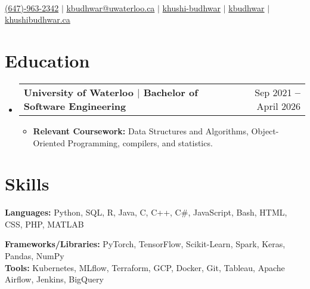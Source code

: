 \documentclass[letterpaper,11pt]{article}
\makeatletter
\newcommand{\resumeItem}[1]{
  \item\small{
    {#1 \vspace{-2pt}}
  }
}
\newcommand{\resumeSubheading}[2]{
  \vspace{-2pt}\item
    \begin{tabular*}{0.97\textwidth}[t]{l@{\extracolsep{\fill}}r}
      \textbf{#1} & \small{#2} \\
    \end{tabular*}\vspace{-5pt}
}
\newcommand{\resumeSubHeadingListStart}{\begin{itemize}[leftmargin=0.15in, label={}]}
\newcommand{\resumeSubHeadingListEnd}{\end{itemize}}
\newcommand{\resumeItemListStart}{\begin{itemize}}
\newcommand{\resumeItemListEnd}{\end{itemize}\vspace{-5pt}}
\makeatother
\begin{document}

\begin{center}
    {\color{customBlue}\sffamily\fontsize{30pt}{96pt}\selectfont {KHUSHI BUDHWAR}} \\ \vspace{3pt}
    \small
    \faMobile \hspace{.5pt} \href{tel:6479632342}{(647)-963-2342}
    {$|$}
    \faEnvelope \hspace{.5pt} \href{mailto:kbudhwar@uwaterloo.ca}{kbudhwar@uwaterloo.ca}
    {$|$}
    \faLinkedinSquare \hspace{.5pt} \href{https://www.linkedin.com/in/khushi-budhwar/}{khushi-budhwar}
    {$|$}
    \scalebox{1.15}{\faGithub} \href{https://github.com/kbudhwar}{kbudhwar}
    {$|$}
    \scalebox{1.1}{\faGlobe}  \href{https://khushibudhwar.ca/}{khushibudhwar.ca}
\end{center}


\section{Education}
  \vspace{3pt}
  \resumeSubHeadingListStart
    \resumeSubheading
      {\color{customBlue} {University of Waterloo} \color{black} $|$ \small{Bachelor of Software} Engineering
      }{Sep 2021 \textbf{--} April 2026}
    \resumeItemListStart
        \resumeItem {\textbf{Relevant Coursework: }Data Structures and Algorithms, Object-Oriented Programming, compilers, and statistics.}
    \resumeItemListEnd
  \resumeSubHeadingListEnd


\section{Skills}
  \vspace{2pt}
  \resumeSubHeadingListStart
    \small{\item{
        
        \textbf{Languages:}{ Python, SQL, R, Java, C, C++, C\#, JavaScript, Bash, HTML, CSS, PHP, MATLAB} \\ \vspace{3pt}
        
        \textbf{Frameworks/Libraries:}{ PyTorch, TensorFlow, Scikit-Learn, Spark, Keras, Pandas, NumPy} \\ \vspace{3pt}
        \textbf{Tools:}{ Kubernetes, MLflow, Terraform, GCP, Docker, Git, Tableau, Apache Airflow, Jenkins, BigQuery} \\ \vspace{3pt}
        
    }}
  \resumeSubHeadingListEnd
\end{document}
